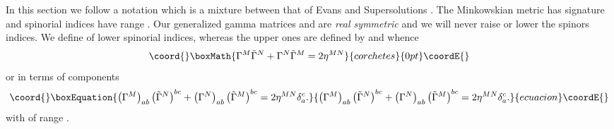 \documentclass[a4paper,12pt]{book}
\begin{document}
In this section we follow a notation which is a mixture between that of
Evans \cite{r4}\cite{r6} and Supersolutions \cite{supersol}. The Minkowskian
metric has signature \coordHE{} and
spinorial indices have range \coordHE{}. Our generalized gamma matrices \myHighlight{$\Gamma $}\coordHE{}
and \myHighlight{$\tilde{\Gamma}$}\coordHE{} are \emph{real symmetric} and we will never raise or
lower the spinors indices. We define \coordHE{} of
lower spinorial indices, whereas the upper ones are defined by \coordHE{} and \coordHE{} whence 
\[\coord{}\boxMath{
\Gamma ^{M}\tilde{\Gamma}^{N}+\Gamma ^{N}\tilde{\Gamma}^{M}=2\eta ^{MN} 
}{corchetes}{0pt}\coordE{}\]
or in terms of components 
\begin{equation}\coord{}\boxEquation{
\left( \Gamma ^{M}\right) _{ab}\left( \tilde{\Gamma}^{N}\right) ^{bc}+\left(
\Gamma ^{N}\right) _{ab}\left( \tilde{\Gamma}^{M}\right) ^{bc}=2\eta
^{MN}\delta _{a}^{c}.
}{
\left( \Gamma ^{M}\right) _{ab}\left( \tilde{\Gamma}^{N}\right) ^{bc}+\left(
\Gamma ^{N}\right) _{ab}\left( \tilde{\Gamma}^{M}\right) ^{bc}=2\eta
^{MN}\delta _{a}^{c}.
}{ecuacion}\coordE{}\end{equation}
with \coordHE{} of range \coordHE{}.
\end{document}
